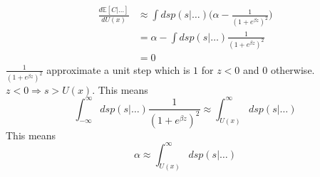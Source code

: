 \begin{example}
	\begin{equation}
		\begin{split}
			\frac{d\mathbb{E}[C|\dots ]}{dU(x)} &\approx \int ds p(s|\dots) \bigg(\alpha -\frac{1}{(1+e^{\beta z})^2}\bigg)\\
			& = \alpha -\int ds p(s|\dots)\frac{1}{(1+e^{\beta z})^2}\\
			& = 0
		\end{split}
	\end{equation}
	$\frac{1}{(1+e^{\beta z})^2}$ approximate a unit step which is $1$ for $z<0$ and $0$ otherwise. $z<0 \Rightarrow s>U(x)$. This means
	\begin{equation}
		\int_{-\infty}^{\infty} ds p(s|\dots)\frac{1}{(1+e^{\beta z})^2} \approx \int_{U(x)}^{\infty} ds p(s|\dots)
	\end{equation}
	This means
	\begin{equation}
		\alpha \approx \int_{U(x)}^{\infty} ds p(s|\dots)
	\end{equation}
\end{example}

